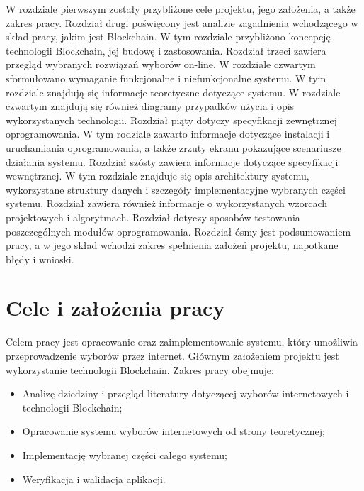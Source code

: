 \documentclass[a4paper,12pt]{book}
\begin{document}
W rozdziale pierwszym zostały przybliżone cele projektu, jego założenia, a także zakres pracy. Rozdział drugi poświęcony jest analizie zagadnienia wchodzącego w skład pracy, jakim jest Blockchain. W tym rozdziale przybliżono koncepcję technologii Blockchain, jej budowę i zastosowania. Rozdział trzeci zawiera przegląd wybranych rozwiązań wyborów on-line. W rozdziale czwartym sformułowano wymaganie funkcjonalne i niefunkcjonalne systemu. W tym rozdziale znajdują się informacje teoretyczne dotyczące systemu. W rozdziale czwartym znajdują się również diagramy przypadków użycia i opis wykorzystanych technologii. Rozdział piąty dotyczy specyfikacji zewnętrznej oprogramowania. W tym rodziale zawarto informacje dotyczące instalacji i uruchamiania oprogramowania, a także zrzuty ekranu pokazujące scenariusze działania systemu. Rozdział szósty zawiera informacje dotyczące specyfikacji wewnętrznej. W tym rozdziale znajduje się opis architektury systemu, wykorzystane struktury danych i szczegóły implementacyjne wybranych części systemu. Rozdział zawiera również informacje o wykorzystanych wzorcach projektowych i algorytmach. Rozdział dotyczy sposobów testowania poszczególnych modułów oprogramowania. Rozdział ósmy jest podsumowaniem pracy, a w jego skład wchodzi zakres spełnienia założeń projektu, napotkane błędy i wnioski.

\section{Cele i założenia pracy}

Celem pracy jest opracowanie oraz zaimplementowanie systemu, który umożliwia przeprowadzenie wyborów przez internet. Głównym założeniem projektu jest wykorzystanie technologii Blockchain. Zakres pracy obejmuje:

\begin{itemize}
	\item Analizę dziedziny i przegląd literatury dotyczącej wyborów internetowych i technologii Blockchain;
	\item Opracowanie systemu wyborów internetowych od strony teoretycznej;
	\item Implementację wybranej części całego systemu;
	\item Weryfikacja i walidacja aplikacji.
\end{itemize}
\end{document}
